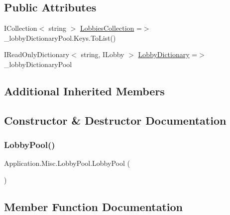 \subsection*{Public Attributes}
\begin{DoxyCompactItemize}
\item 
I\+Collection$<$ string $>$ \mbox{\hyperlink{class_application_1_1_misc_1_1_lobby_pool_a458073f24e69b53446da0a03050664e1}{Lobbies\+Collection}} =$>$ \+\_\+lobby\+Dictionary\+Pool.\+Keys.\+To\+List()
\item 
I\+Read\+Only\+Dictionary$<$ string, I\+Lobby $>$ \mbox{\hyperlink{class_application_1_1_misc_1_1_lobby_pool_a807b21ba18c87a433c8d9ff1fc5c00f1}{Lobby\+Dictionary}} =$>$ \+\_\+lobby\+Dictionary\+Pool
\end{DoxyCompactItemize}
\subsection*{Additional Inherited Members}


\subsection{Constructor \& Destructor Documentation}
\mbox{\label{class_application_1_1_misc_1_1_lobby_pool_adefb9ad44d5c53d09f31a79ff5a96e89}} 
\subsubsection{\texorpdfstring{Lobby\+Pool()}{LobbyPool()}}
{\footnotesize\ttfamily Application.\+Misc.\+Lobby\+Pool.\+Lobby\+Pool (\begin{DoxyParamCaption}{ }\end{DoxyParamCaption})}



\subsection{Member Function Documentation}
\mbox{\label{class_application_1_1_misc_1_1_lobby_pool_a442eb666b16bc75025732413f38b0846}} 

